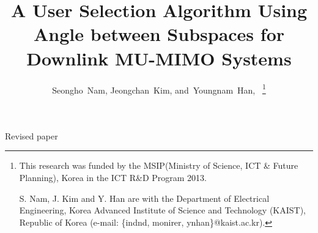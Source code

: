 \documentclass[journal,twoside]{IEEEtranTCOM}
\begin{document}
%
\title{A User Selection Algorithm Using Angle between Subspaces for Downlink MU-MIMO Systems }
%
%
%

\author{Seongho~Nam,
        Jeongchan~Kim,
        and~Youngnam~Han,~
\thanks{This research was funded by the MSIP(Ministry of Science, ICT \& Future Planning), Korea in the ICT R\&D Program 2013.

S. Nam, J. Kim and Y. Han are with the Department
of Electrical Engineering, Korea Advanced Institute of Science and Technology (KAIST), Republic of Korea (e-mail: \{indnd, monirer, ynhan\}@kaist.ac.kr). }

}


%
{Revised paper}
%









\maketitle
\end{document}
